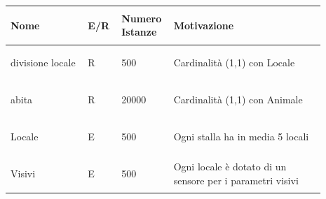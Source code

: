 \documentclass[12pt,a4paper]{article}
\begin{document}
\begin{center}\setlength{\extrarowheight}{1.5pt}\begin{longtable}{|p{0.23\linewidth}|p{0.1\linewidth}|p{0.11\linewidth}|p{0.45\linewidth}|}



\hline \textbf{Nome}   & \begin{center}\vspace{-15pt}\textbf{E/R}\end{center} & \textbf{Numero Istanze} & \textbf{Motivazione}\\ 

\hline
divisione locale 				& \begin{center}
\vspace{-25pt}R
\end{center}
					& \begin{center}
					\vspace{-25pt}500\end{center}
					&  Cardinalità (1,1) con Locale \\ 
					
\hline
abita 				& \begin{center}
\vspace{-25pt}R
\end{center}
					& \begin{center}
					\vspace{-25pt}20000\end{center}
					&  Cardinalità (1,1) con Animale \\ 


\hline
Locale 				& \begin{center}
\vspace{-25pt}E
\end{center}
					& \begin{center}
					\vspace{-25pt}500\end{center}
					&  Ogni stalla ha in media 5 locali \\ 
					
\hline
Visivi 				& \begin{center}
\vspace{-25pt}E
\end{center}
					& \begin{center}
					\vspace{-25pt}500\end{center}
					&  Ogni locale è dotato di un sensore per i parametri visivi \\ 


\end{longtable}
\end{center}
\end{document}
